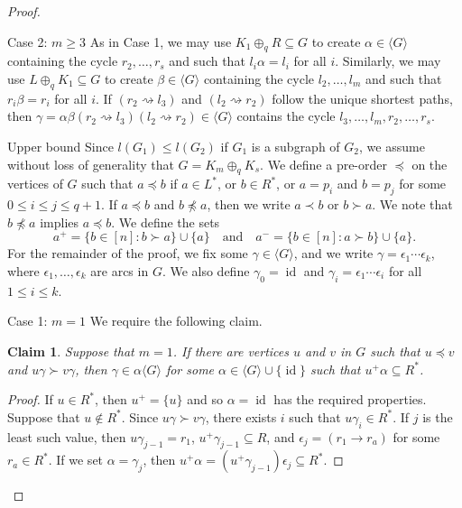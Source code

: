 \documentclass[10pt]{amsart}
\newtheorem{claim}[proposition]{Claim}
\newenvironment{enonce*}[2][]{\par\smallskip\noindent\textbf{#2}.\par\nobreak}{\par\smallskip}
\DeclareMathOperator{\id}{id}
\newcommand{\genset}[1]{\langle#1\rangle}
\newcommand{\nset}{[n]}
\begin{document}
\begin{proof}
\begin{enonce*}[remark]{Case 2: ${m \geq 3}$}
 As in Case 1, we may use $K_1 \oplus_q R\subseteq G$ to create
 $\alpha\in\genset{G}$ containing the cycle $r_2, \ldots, r_s$ and such that
 $l_i\alpha = l_i$ for all $i$. Similarly, we may use $L\oplus_q
 K_1\subseteq G$ to create $\beta\in\genset{G}$ containing the cycle
 $l_2, \ldots, l_m$ and such that $r_i\beta = r_i$ for all $i$. If 
 $(r_2 \rightsquigarrow l_3)$ and $(l_2
 \rightsquigarrow r_2)$ follow the unique shortest paths, then 
 $\gamma = \alpha \beta (r_2 \rightsquigarrow l_3) (l_2 \rightsquigarrow
 r_2)\in\genset{G}$ contains the cycle $l_3, \ldots, l_m, r_2, \ldots, r_s$.
\end{enonce*}

\begin{enonce*}[remark]{Upper bound} 
Since $l(G_1) \le l(G_2)$ if $G_1$ is a subgraph of $G_2$, we assume without
loss of generality that $G = K_m \oplus_q K_s$. 
We define a pre-order $\preceq$ on the vertices of $G$ such that 
$a \preceq b$ if $a \in L ^*$, or $b \in R ^ *$, or $a = p_i$ and $b= p_j$ for some
$0\leq i\leq j\leq q+1$. If $a\preceq b$ and $b\not\preceq a$, then we write
$a \prec b$ or $b\succ a$. We note that $b\not\preceq a$ implies $a\preceq b$. 
We define the sets
\[a^+ = \{b \in \nset : b \succ a \} \cup \{a\}\quad\text{and}\quad
a^- = \{b \in \nset : a \succ b \} \cup \{a\}.\]
For the remainder of the proof, we fix some $\gamma\in\genset{G}$, and we write $\gamma
= \epsilon_1 \cdots \epsilon_k$, where $\epsilon_1, \ldots, \epsilon_k$ are arcs
in $G$. We also define $\gamma_0 = \id$ and $\gamma_i = \epsilon_1 \cdots
\epsilon_i$ for all $1 \le i \le k$.
\end{enonce*}

\begin{enonce*}[remark]{Case 1: ${m = 1}$}
We require the following claim.
\end{enonce*}

\begin{claim} \label{claim:jumping1}
 Suppose that $m = 1$. If there are vertices $u$ and $v$ in $G$ such that
 $u\preceq v$ and $u\gamma \succ v\gamma$, then $\gamma \in \alpha \genset{G}$
 for some $\alpha \in \genset{G} \cup \{ \id \}$ such that $u^+ \alpha
 \subseteq R^*$.
\end{claim}

\begin{proof}
 If $u \in R^*$, then $u^+=\{u\}$ and so $\alpha = \id$ has the required
 properties. Suppose that $u \notin R^*$. Since $u \gamma \succ v \gamma$,
 there exists $i$ such that $u \gamma_i \in R ^ *$. If $j$ is the least such
 value, then $u \gamma_{j-1} = r_1$, $u^+ \gamma_{j-1} \subseteq R$, and
 $\epsilon_j = (r_1 \to r_a)$ for some $r_a \in R^*$. If we set $\alpha =
 \gamma_j$, then $u^+ \alpha = (u^+ \gamma_{j-1})\epsilon_j \subseteq R^*$.
\end{proof}


\end{proof}
\end{document}
